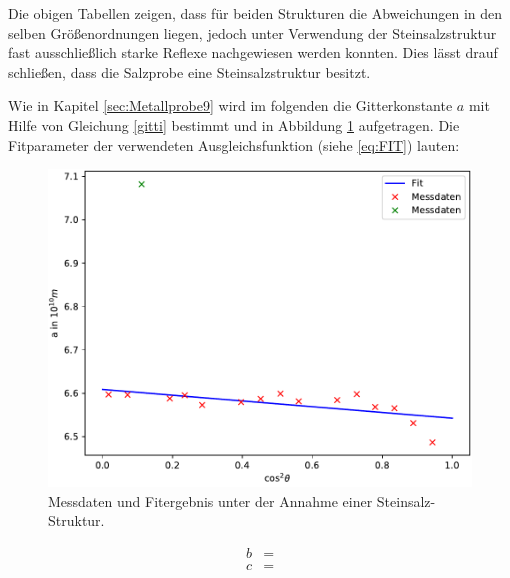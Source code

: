% 





Die obigen Tabellen zeigen, dass für beiden Strukturen die Abweichungen in den selben Größenordnungen liegen, jedoch unter Verwendung der Steinsalzstruktur fast ausschließlich starke Reflexe nachgewiesen werden konnten. Dies lässt drauf schließen, dass die Salzprobe eine Steinsalzstruktur besitzt.


Wie in Kapitel \ref{sec:Metallprobe9} wird im folgenden die Gitterkonstante $a$ mit Hilfe von Gleichung \eqref{gitti} bestimmt und in Abbildung \ref{fig:SalzC} aufgetragen. Die Fitparameter der verwendeten Ausgleichsfunktion (siehe \ref{eq:FIT}) lauten:


\begin{figure}
  \centering
  \includegraphics[scale=0.75]{build/Salz_lasttry.pdf}
  \caption{Messdaten und Fitergebnis unter der Annahme einer Steinsalz-Struktur.}
  \label{fig:SalzC}
\end{figure}


\begin{align}
	b&=  \\
	c&= 
\end{align}


